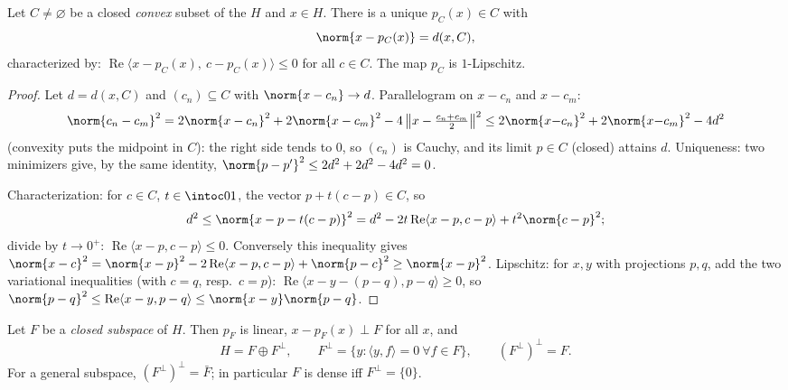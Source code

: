 \begin{theorem}
\label{thm:b3:hilbert:projection}
Let $C \neq \varnothing$ be a closed \emph{convex} subset of
the  $H$ and $x \in H$. There is a unique $p_C(x)
\in C$ with
\[
\norm{x - p_C(x)} = d(x, C),
\]
characterized by: $\operatorname{Re}\langle x - p_C(x),\ c -
p_C(x)\rangle \leq 0$ for all $c \in C$. The map $p_C$ is
$1$-Lipschitz.
\end{theorem}

\begin{proof}
Let $d = d(x, C)$ and $(c_n) \subseteq C$ with $\norm{x - c_n}
\to d$. Parallelogram on $x - c_n$ and $x - c_m$:
\[
\norm{c_n - c_m}^2 = 2\norm{x - c_n}^2 + 2\norm{x - c_m}^2 -
4\,\bigl\|x - \tfrac{c_n + c_m}2\bigr\|^2
\leq 2\norm{x{-}c_n}^2 + 2\norm{x{-}c_m}^2 - 4d^2
\]
(convexity puts the midpoint in $C$): the right side tends to
$0$, so $(c_n)$ is Cauchy, and its limit $p \in C$ (closed)
attains $d$. Uniqueness: two minimizers give, by the same
identity, $\norm{p - p'}^2 \leq 2d^2 + 2d^2 - 4d^2 = 0$.

Characterization: for $c \in C$, $t \in \intoc01$, the vector
$p + t(c - p) \in C$, so
\[
d^2 \leq \norm{x - p - t(c-p)}^2
= d^2 - 2t\operatorname{Re}\langle x - p, c - p\rangle +
t^2\norm{c-p}^2 ;
\]
divide by $t \to 0^+$: $\operatorname{Re}\langle x - p, c -
p\rangle \leq 0$. Conversely this inequality gives $\norm{x -
c}^2 = \norm{x - p}^2 - 2\operatorname{Re}\langle x - p, c -
p\rangle + \norm{p - c}^2 \geq \norm{x-p}^2$. Lipschitz: for
$x, y$ with projections $p, q$, add the two variational
inequalities (with $c = q$, resp.\ $c = p$):
$\operatorname{Re}\langle x - y - (p - q), p - q\rangle \geq
0$, so $\norm{p - q}^2 \leq \operatorname{Re}\langle x - y, p -
q\rangle \leq \norm{x - y}\norm{p - q}$.
\end{proof}

\begin{theorem}
\label{thm:b3:hilbert:decomposition}
Let $F$ be a \emph{closed subspace} of $H$. Then $p_F$ is
linear, $x - p_F(x) \perp F$ for all $x$, and
\[
H = F \oplus F^\perp,
\qquad F^\perp = \{y : \langle y, f\rangle = 0\ \forall f\in
F\},
\qquad (F^\perp)^\perp = F .
\]
For a general subspace, $(F^\perp)^\perp = \bar F$; in
particular $F$ is dense iff $F^\perp = \{0\}$.
\end{theorem}

